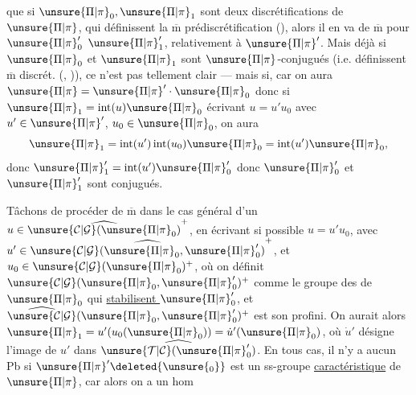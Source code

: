 que  si $\unsure{\Pi|\pi}_0,\unsure{\Pi|\pi}_1$ sont deux discrétifications  de $\unsure{\Pi|\pi}$, qui définissent la $\overline{\mathrm m}$ prédiscrétification (), alors il en va de $\overline{\mathrm m}$ pour  $\unsure{\Pi|\pi}'_0$  $\unsure{\Pi|\pi}'_1$, relativement à $\unsure{\Pi|\pi}'$. Mais déjà si $\unsure{\Pi|\pi}_0$ et $\unsure{\Pi|\pi}_1$ sont $\unsure{\Pi|\pi}$-conjugués (i.e. définissent $\overline{\mathrm m}$ discrét. (, \uline{})), ce n'est pas tellement clair ---  mais si, car on aura $\unsure{\Pi|\pi}=\unsure{\Pi|\pi}'\cdot\unsure{\Pi|\pi}_0$ donc si $\unsure{\Pi|\pi}_1=\operatorname{int}(u)\unsure{\Pi|\pi}_0$ écrivant $u=u'u_0$ avec $u'\in\unsure{\Pi|\pi}'$, $u_0\in\unsure{\Pi|\pi}_0$, on aura
\[
\unsure{\Pi|\pi}_1=\operatorname{int}(u')\operatorname{int}(u_0)\unsure{\Pi|\pi}_0=\operatorname{int}(u')\unsure{\Pi|\pi}_0,
\]
donc $\unsure{\Pi|\pi}'_1=\operatorname{int}(u')\unsure{\Pi|\pi}'_0$ donc $\unsure{\Pi|\pi}'_0$ et $\unsure{\Pi|\pi}'_1$ sont conjugués.

Tâchons de procéder de $\overline{\mathrm m}$ dans le cas général d'un $u\in\widehat{\unsure{\mathcal{C}|\mathcal{G}}(\unsure{\Pi|\pi}_0)}^+$,  en écrivant si possible $u=u'u_0$, avec $u'\in\widehat{\unsure{\mathcal{C}|\mathcal{G}}(\unsure{\Pi|\pi}_0,\unsure{\Pi|\pi}'_0)}^+$, et $u_0\in\unsure{\mathcal{C}|\mathcal{G}}(\unsure{\Pi|\pi}_0)^+$, où on définit $\unsure{\mathcal{C}|\mathcal{G}}(\unsure{\Pi|\pi}_0,\unsure{\Pi|\pi}'_0)^+$ comme le groupe des   de $\unsure{\Pi|\pi}_0$ qui \uline{stabilisent $\unsure{\Pi|\pi}'_0$}, et $\widehat{\unsure{\mathcal{C}|\mathcal{G}}}(\unsure{\Pi|\pi}_0,\unsure{\Pi|\pi}'_0)^+$ est son  profini. On aurait alors $\unsure{\Pi|\pi}_1=u'(u_0(\unsure{\Pi|\pi}_0))=\dot{u}'(\unsure{\Pi|\pi}_0)$, où  $\dot{u}'$ désigne l'image de $u'$ dans $\widehat{\unsure{\mathcal{T}|\mathcal{C}}(\unsure{\Pi|\pi}'_0)}$. En tous cas, il n'y a aucun Pb si $\unsure{\Pi|\pi}'\deleted{\unsure{_0}}$ est un ss-groupe  \uline{caractéristique} de $\unsure{\Pi|\pi}$, car alors on a un hom

